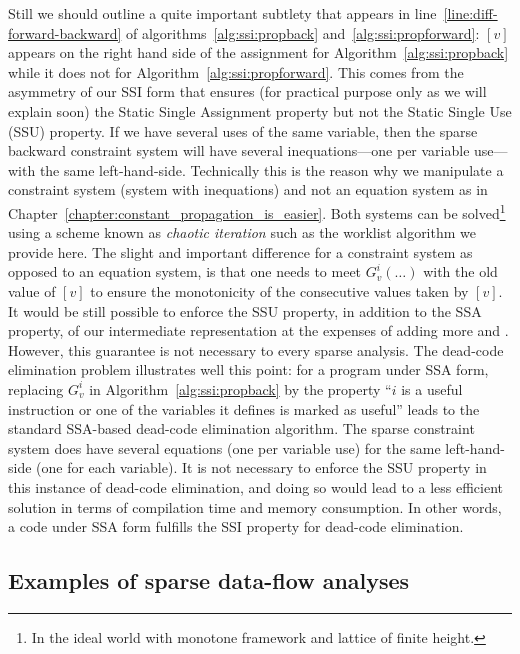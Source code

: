 {Still we should outline a quite important subtlety that appears in 
line~\ref{line:diff-forward-backward} of algorithms~\ref{alg:ssi:propback} 
and~\ref{alg:ssi:propforward}: $[v]$ appears on the right hand side of the 
assignment for Algorithm~\ref{alg:ssi:propback} while it does not for 
Algorithm~\ref{alg:ssi:propforward}. This comes from the asymmetry of our SSI 
form that ensures (for practical purpose only as we will explain soon) the 
Static Single Assignment property but not the Static Single Use (SSU) property.
If we have several uses of the same variable, then the sparse backward 
constraint system will have several inequations---one per variable use---with 
the same left-hand-side.
Technically this is the reason why we manipulate a constraint system (system 
with inequations) and not an equation system as in 
Chapter~\ref{chapter:constant_propagation_is_easier}. Both systems can be 
solved\footnote{In the ideal world with monotone framework and lattice of 
finite height.} using a scheme known as \emph{chaotic iteration} such as the worklist algorithm we provide here. The slight and 
important difference for a constraint system as opposed to an equation system, 
is that one needs to meet $G_v^i(\dots)$ with the old value of $[v]$ to ensure 
the monotonicity of the consecutive values taken by $[v]$.
It would be still possible to enforce the SSU property, in addition to the SSA property, of our intermediate representation at the expenses of adding more \phifuns and \sigmafuns.
However, this guarantee is not necessary to every sparse analysis.
The dead-code elimination problem illustrates well this point:
for a program under SSA form, replacing $G_v^i$ in 
Algorithm~\ref{alg:ssi:propback} by the property ``$i$ is a useful instruction 
or one of the variables it defines is marked as useful'' leads to the standard 
SSA-based dead-code elimination algorithm.
The sparse constraint system does have several equations (one per variable use) for the same left-hand-side (one for each variable).
It is not necessary to enforce the SSU property in this instance of dead-code 
elimination, and doing so would lead to a less efficient solution in terms of 
compilation time and memory consumption.
In other words, a code under SSA form fulfills the SSI property for dead-code elimination.


\subsection{Examples of sparse data-flow analyses}
\label{sub:ssi:examples}

}
